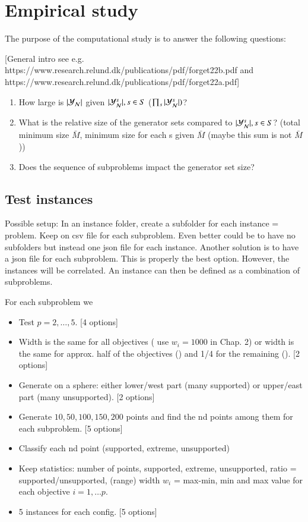 \section{Empirical study}

The purpose of the computational study is to answer the following questions:

[General intro see e.g. https://www.research.relund.dk/publications/pdf/forget22b.pdf and https://www.research.relund.dk/publications/pdf/forget22a.pdf]

\begin{enumerate}
    \item How large is $|\mathcal{Y}_{\mathcal{N}}|$ given $|\mathcal{Y}_{\mathcal{N}}^s|, s\in S$ ($\prod_s |\mathcal{Y}_{\mathcal{N}}^s|)$?
    \item What is the relative size of the generator sets compared to $|\mathcal{Y}_{\mathcal{N}}^s|, s\in S$? (total minimum size $\bar{M}$, minimum size for each s given $\bar{M}$ (maybe this sum is not $\bar{M}$))
    \item Does the sequence of subproblems impact the generator set size? 
\end{enumerate}

\subsection{Test instances}

Possible setup: In an instance folder, create a subfolder for each instance = problem. Keep on csv file for each subproblem. Even better could be to have no subfolders but instead one json file for each instance. Another solution is to have a json file for each subproblem. This is properly the best option. However, the instances will be correlated. An instance can then be defined as a combination of subproblems.

For each subproblem we

\begin{itemize}
    \item Test $p=2,\ldots, 5$. [4 options]
    \item Width is the same for all objectives (\cite{Kerberenes2022phd} use $w_i=1000$ in Chap. 2) or width is the same for approx. half of the objectives () and 1/4 for the remaining (). [2 options]
    \item Generate on a sphere: either lower/west part (many supported) or upper/east part (many unsupported). [2 options]
    \item Generate $10, 50, 100, 150, 200$ points and find the nd points among them for each subproblem. [5 options]
    \item Classify each nd point (supported, extreme, unsupported)
    \item Keep statistics: number of points, supported, extreme, unsupported, ratio = supported/unsupported, (range) width $w_i$ = max-min, min and max value for each objective $i = 1,\ldots p$.
    \item 5 instances for each config. [5 options]
\end{itemize}

